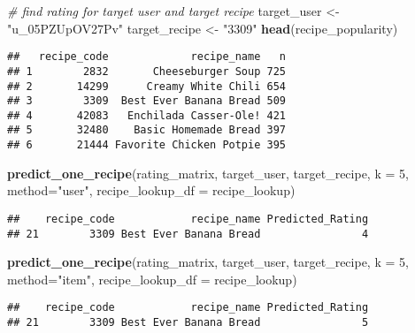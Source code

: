 \documentclass[
]{article}
\newenvironment{Shaded}{\begin{snugshade}}{\end{snugshade}}
\newcommand{\AttributeTok}[1]{\textcolor[rgb]{0.13,0.29,0.53}{#1}}
\newcommand{\CommentTok}[1]{\textcolor[rgb]{0.56,0.35,0.01}{\textit{#1}}}
\newcommand{\DecValTok}[1]{\textcolor[rgb]{0.00,0.00,0.81}{#1}}
\newcommand{\FunctionTok}[1]{\textcolor[rgb]{0.13,0.29,0.53}{\textbf{#1}}}
\newcommand{\NormalTok}[1]{#1}
\newcommand{\OtherTok}[1]{\textcolor[rgb]{0.56,0.35,0.01}{#1}}
\newcommand{\StringTok}[1]{\textcolor[rgb]{0.31,0.60,0.02}{#1}}
\begin{document}
\begin{Shaded}
\begin{Highlighting}[]
\CommentTok{\# find rating for target user and target recipe }
\NormalTok{target\_user }\OtherTok{\textless{}{-}} \StringTok{"u\_05PZUpOV27Pv"}
\NormalTok{target\_recipe }\OtherTok{\textless{}{-}} \StringTok{"3309"}
\FunctionTok{head}\NormalTok{(recipe\_popularity)}
\end{Highlighting}
\end{Shaded}

\begin{verbatim}
##   recipe_code             recipe_name   n
## 1        2832       Cheeseburger Soup 725
## 2       14299      Creamy White Chili 654
## 3        3309  Best Ever Banana Bread 509
## 4       42083   Enchilada Casser-Ole! 421
## 5       32480    Basic Homemade Bread 397
## 6       21444 Favorite Chicken Potpie 395
\end{verbatim}

\begin{Shaded}
\begin{Highlighting}[]
\FunctionTok{predict\_one\_recipe}\NormalTok{(rating\_matrix, target\_user, target\_recipe, }\AttributeTok{k =} \DecValTok{5}\NormalTok{, }\AttributeTok{method=}\StringTok{"user"}\NormalTok{, }
                   \AttributeTok{recipe\_lookup\_df =}\NormalTok{ recipe\_lookup)}
\end{Highlighting}
\end{Shaded}

\begin{verbatim}
##    recipe_code            recipe_name Predicted_Rating
## 21        3309 Best Ever Banana Bread                4
\end{verbatim}

\begin{Shaded}
\begin{Highlighting}[]
\FunctionTok{predict\_one\_recipe}\NormalTok{(rating\_matrix, target\_user, target\_recipe, }\AttributeTok{k =} \DecValTok{5}\NormalTok{, }\AttributeTok{method=}\StringTok{"item"}\NormalTok{, }
                   \AttributeTok{recipe\_lookup\_df =}\NormalTok{ recipe\_lookup)}
\end{Highlighting}
\end{Shaded}

\begin{verbatim}
##    recipe_code            recipe_name Predicted_Rating
## 21        3309 Best Ever Banana Bread                5
\end{verbatim}
\end{document}
